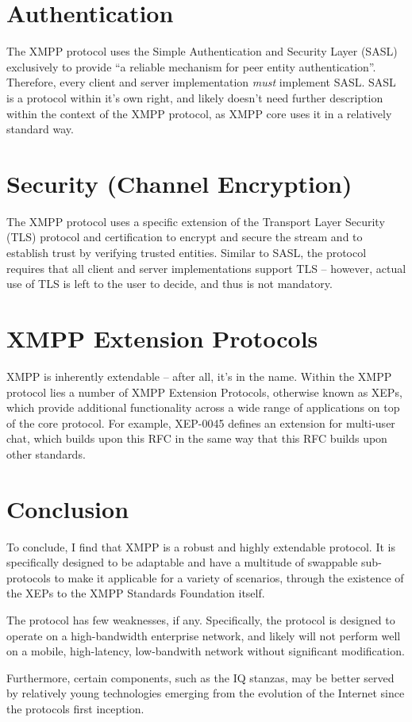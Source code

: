\documentclass{article}
\begin{document}
\section{Authentication}
The XMPP protocol uses the Simple Authentication and Security Layer (SASL)
exclusively to provide ``a reliable mechanism for peer entity authentication''.
Therefore, every client and server implementation \emph{must} implement SASL.
SASL is a protocol within it's own right, and likely doesn't need further
description within the context of the XMPP protocol, as XMPP core uses it in a
relatively standard way.

\section{Security (Channel Encryption)}
The XMPP protocol uses a specific extension of the Transport Layer Security
(TLS) protocol and certification to encrypt and secure the stream and to
establish trust by verifying trusted entities. Similar to SASL, the protocol
requires that all client and server implementations support TLS -- however,
actual use of TLS is left to the user to decide, and thus is not mandatory.

\section{XMPP Extension Protocols}
XMPP is inherently extendable -- after all, it's in the name. Within the XMPP
protocol lies a number of XMPP Extension Protocols, otherwise known as XEPs,
which provide additional functionality across a wide range of applications on
top of the core protocol. For example, XEP-0045 defines an extension for
multi-user chat, which builds upon this RFC in the same way that this RFC builds
upon other standards.

\section{Conclusion}
To conclude, I find that XMPP is a robust and highly extendable protocol. It is
specifically designed to be adaptable and have a multitude of swappable
sub-protocols to make it applicable for a variety of scenarios, through the
existence of the XEPs to the XMPP Standards Foundation itself. 

The protocol has few weaknesses, if any. Specifically, the protocol is designed
to operate on a high-bandwidth enterprise network, and likely will not perform
well on a mobile, high-latency, low-bandwith network without significant
modification.

Furthermore, certain components, such as the IQ stanzas, may be better served by
relatively young technologies emerging from the evolution of the Internet since
the protocols first inception.
\end{document}
